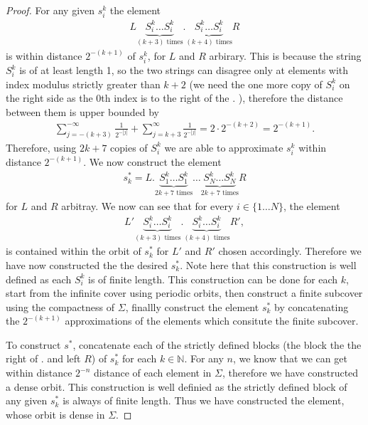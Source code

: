\begin{proof}
For any given $s_{i}^{k}$ the element
\begin{align}
	{L} \underbrace{S_{i}^{k} \ldots S_{i}^{k}}_{(k+3) \textrm{ times} }\bm{.}  \underbrace{S_{i}^{k} \ldots S_{i}^{k}}_{(k+4) \textrm{ times} } {R}
\end{align}
is within distance $2^{-(k+1)}$ of $s_{i}^{k}$, for $L$ and $R$ arbirary. This is because the string $S_{i}^{k}$ is of at least length 1, so the two strings can disagree only at elements with index modulus strictly greater than $k+2$ (we need the one more copy of $S_{i}^{k}$ on the right side as the 0th index is to the right of the $\bm{.} $ ), therefore the distance between them is upper bounded by
	\begin{align}
		\sum_{j=-(k+3)}^{-\infty }\frac{1}{2^{-|j|}} + \sum_{j = k+3}^{\infty } \frac{1}{2^{-|j|}} = 2 \cdot 2^{-(k+2)} = 2^{-(k+1)}.   	
	\end{align}
	Therefore, using $2k+7$ copies of $S_{i}^{k}$ we are able to approximate $s_{i}^{k}$ within distance $2^{-(k+1)}$. We now construct the element
	\begin{align}
		s_{k}^{*} = L \bm{.} \underbrace{S_{1}^{k} \ldots S_{1}^{k}}_{2k+7  \textrm{ times} } \ldots \underbrace{S_{N}^{k} \ldots S_{N}^{k}}_{2k+7  \textrm{ times} } R
	\end{align}
	for $L$ and $R$ arbitray. We now can see that for every $i\in\{1 \ldots N\}$, the element 
	\begin{align}
		L' \underbrace{S_{i}^{k} \ldots S_{i}^{k}}_{(k+3) \textrm{ times} } \bm{.} 
		\underbrace{S_{i}^{k} \ldots S_{i}^{k}}_{(k+4) \textrm{ times} } R',
	\end{align}
	is contained within the orbit of $s_{k}^{*}$ for $L'$ and $R'$ chosen accordingly. Therefore we have now constructed the the desired $s_{k}^{*}$. Note here that this construction is well defined as each $S_{i}^{k}$ is of finite length. This construction can be done for each $k$, start from the infinite cover using periodic orbits, then construct a finite subcover using the compactness of $\Sigma$, finallly construct the element $s_{k}^{*}$ by concatenating the $2^{-(k+1)}$ approximations of the elements which consitute the finite subcover. 

	To construct $s^{*}$, concatenate each of the strictly defined blocks (the block the the right of $\bm{.} $ and left $R$) of $s_{k}^{*}$ for each $k \in \mathbb{N}$. For any $n$, we know that we can get within distance $2^{-n}$ distance of each element in $\Sigma$, therefore we have constructed a dense orbit. This construction is well definied as the strictly defined block of any given $s_{k}^{*}$ is always of finite length. Thus we have constructed the element, whose orbit is dense in $\Sigma$.
\end{proof}


